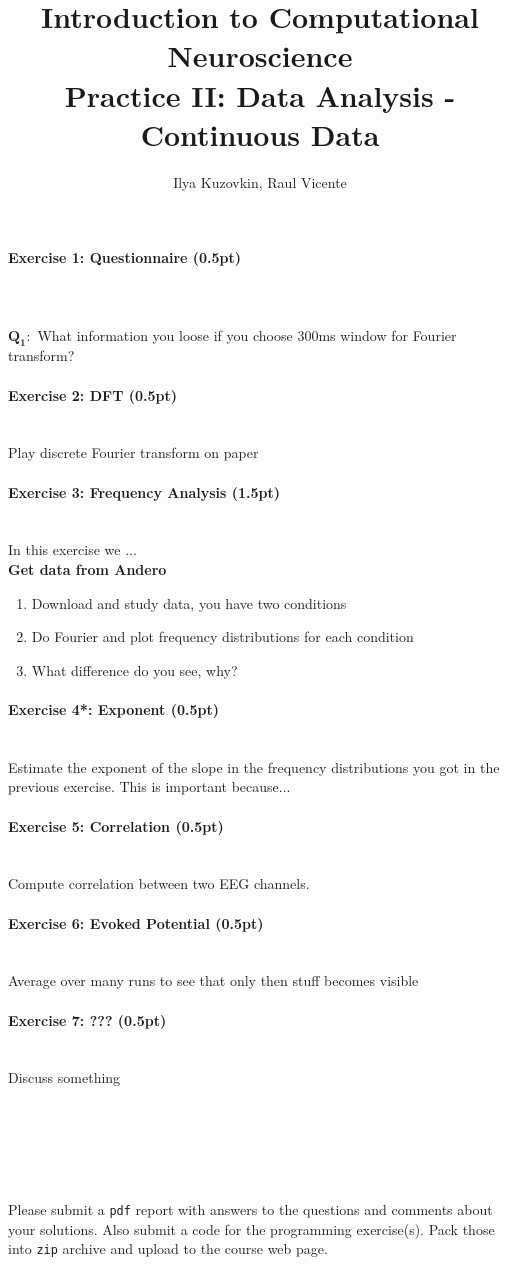\documentclass[a4paper,11pt]{article}
\author{\large{Ilya Kuzovkin, Raul Vicente}}
\title{\huge{Introduction to Computational Neuroscience}\\\LARGE{Practice II: Data Analysis - Continuous Data}}
\newenvironment{exercise}[3]{\paragraph{Exercise #1: #2 (#3pt)}\ \\}{
\medskip}
\newcommand{\question}[2]{\setlength\parindent{0mm}\ \\$\mathbf{Q_#1:}$ #2\ \\}
\begin{document}
\maketitle

\begin{exercise}{1}{Questionnaire}{0.5}
\question{1}{What information you loose if you choose 300ms window for Fourier transform?}
\end{exercise}

\begin{exercise}{2}{DFT}{0.5}
Play discrete Fourier transform on paper
\end{exercise}

\begin{exercise}{3}{Frequency Analysis}{1.5}
In this exercise we ... \\
\textbf{Get data from Andero}
\begin{enumerate}
\itemsep 0em
	\item Download and study data, you have two conditions
	\item Do Fourier and plot frequency distributions for each condition
	\item What difference do you see, why?
\end{enumerate}
\end{exercise}

\begin{exercise}{4*}{Exponent}{0.5}
Estimate the exponent of the slope in the frequency distributions you got in the previous exercise. This is important because...
\end{exercise}

\begin{exercise}{5}{Correlation}{0.5}
Compute correlation between two EEG channels.
\end{exercise}

\begin{exercise}{6}{Evoked Potential}{0.5}
Average over many runs to see that only then stuff becomes visible
\end{exercise}


\begin{exercise}{7}{???}{0.5}
Discuss something
\end{exercise}
\ \\
\ \\
\ \\
\ \\
\ \\
Please submit a \texttt{pdf} report with answers to the questions and comments about your solutions. Also submit a code for the programming exercise(s). Pack those into \texttt{zip} archive and upload to the course web page.
\end{document}
